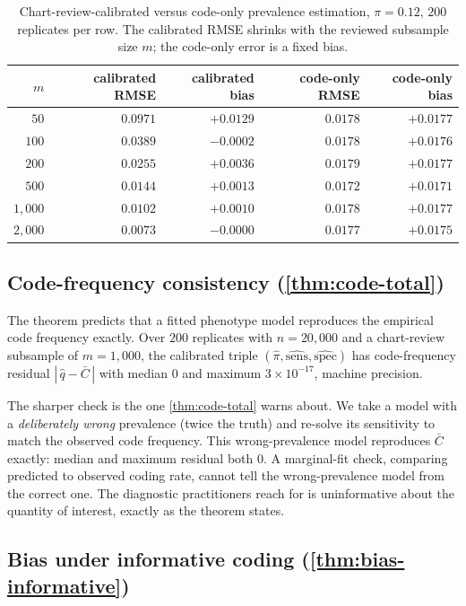 \begin{table}[ht]
\centering
\begin{tabular}{rrrrr}
\toprule
$m$ & calibrated RMSE & calibrated bias & code-only RMSE & code-only bias \\
\midrule
$50$    & $0.0971$ & $+0.0129$  & $0.0178$ & $+0.0177$ \\
$100$   & $0.0389$ & $-0.0002$  & $0.0178$ & $+0.0176$ \\
$200$   & $0.0255$ & $+0.0036$  & $0.0179$ & $+0.0177$ \\
$500$   & $0.0144$ & $+0.0013$  & $0.0172$ & $+0.0171$ \\
$1{,}000$ & $0.0102$ & $+0.0010$ & $0.0178$ & $+0.0177$ \\
$2{,}000$ & $0.0073$ & $-0.0000$ & $0.0177$ & $+0.0175$ \\
\bottomrule
\end{tabular}
\caption{Chart-review-calibrated versus code-only prevalence
estimation, $\pi = 0.12$, $200$ replicates per row. The calibrated
RMSE shrinks with the reviewed subsample size $m$; the code-only error
is a fixed bias.}
\label{tab:chart}
\end{table}

\subsection{Code-frequency consistency (\cref{thm:code-total})}

The theorem predicts that a fitted phenotype model reproduces the
empirical code frequency exactly. Over $200$ replicates with $n =
20{,}000$ and a chart-review subsample of $m = 1{,}000$, the
calibrated triple $(\hat\pi, \widehat{\mathrm{sens}},
\widehat{\mathrm{spec}})$ has code-frequency residual $|\,\hat q -
\bar C\,|$ with median $0$ and maximum $3 \times 10^{-17}$, machine
precision.

The sharper check is the one \cref{thm:code-total} warns about. We take
a model with a \emph{deliberately wrong} prevalence (twice the truth)
and re-solve its sensitivity to match the observed code frequency. This
wrong-prevalence model reproduces $\bar C$ exactly: median and maximum
residual both $0$. A marginal-fit check, comparing predicted to
observed coding rate, cannot tell the wrong-prevalence model from the
correct one. The diagnostic practitioners reach for is uninformative
about the quantity of interest, exactly as the theorem states.

\subsection{Bias under informative coding (\cref{thm:bias-informative})}

